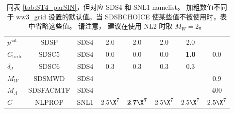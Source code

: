 \begin{landscape}
\begin{table}
\begin{center}
\begin{tabular}{|l|c|c|c|c|c|c|c|}
  $p^{\mathrm{sat}}$               & SDSP          & SDS4      & 2.0         & 2.0              & 2.0          & 2.0         &     \\
  $C_{\mathrm{turb}}$              & SDSC5         & SDS4      & 0.0         &  0.0             & 0.0          & \textbf{1.0}& 0.0 \\
  $\delta_d$                       & SDSC6         & SDS4      & 0.3         &  0.3             & 0.3          &0.3          & \\
  $ M_W$			   & SDSMWD	   & SDS4      &            &                   &              &             & 0.9 \\
  $ M_\Lambda$			   & SDSFACMTF	   & SDS4      &            &                   &              &             & 400 \\
  $C$                              & NLPROP        & SNL1      & $2.5\X^7$   &$\mathbf{2.7\X^7}$& $2.5\X^7$    & $2.5\X^7$   & $2.5\X^7$ \\
 \hline \hline
\end{tabular}
\end{center}

\caption{同表 \ref{tab:ST4_parSIN}，但对应 {\F SDS4} 和 {\F SNL1} namelist。
加粗数值不同于 ww3\_grid 设置的默认值。当 SDSBCHOICE 使某些值不被使用时，表中省略这些值。
请注意，\cite{Romero2019} 建议在使用 NL2 时取 $ M_W=2$。} \label{tab:ST4_parSDS}
\end{table}
\end{landscape}
